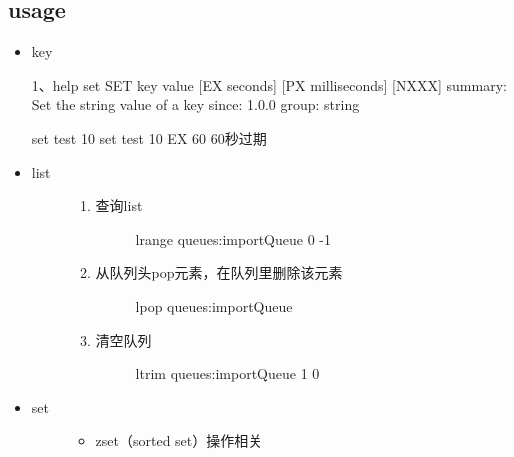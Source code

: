 \documentclass[a4paper,10pt,english]{sphinxmanual}
\begin{document}
\subsection{usage}
\label{\detokenize{program/redis:usage}}\begin{itemize}
\item {} 
key

\begin{sphinxVerbatim}[commandchars=\\\{\}]
1、help set
SET key value [EX seconds] [PX milliseconds] [NX\textbar{}XX]
summary: Set the string value of a key
since: 1.0.0
group: string

set test 10
set test 10 EX 60 60秒过期
\end{sphinxVerbatim}

\item {} \begin{description}
\item[{list}] \leavevmode\begin{enumerate}
\item {} \begin{description}
\item[{查询list}] \leavevmode
lrange queues:importQueue 0 -1

\end{description}

\item {} \begin{description}
\item[{从队列头pop元素，在队列里删除该元素}] \leavevmode
lpop queues:importQueue

\end{description}

\item {} \begin{description}
\item[{清空队列}] \leavevmode
ltrim queues:importQueue 1 0

\end{description}

\end{enumerate}

\end{description}

\item {} \begin{description}
\item[{set}] \leavevmode\begin{itemize}
\item {} 
zset（sorted set）操作相关


\end{itemize}
\end{description}
\end{itemize}
\end{document}
